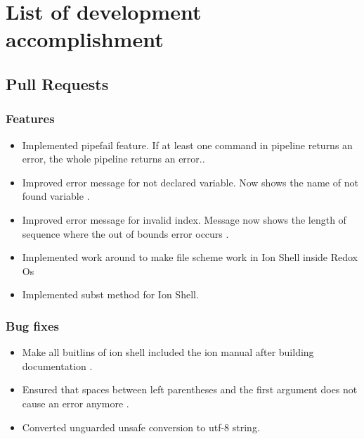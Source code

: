 \chapter{List of development accomplishment}

\section{Pull Requests}

\subsection{Features}
\label{accomplishment_features}

\begin{itemize}
	\item Implemented pipefail feature. If at least one command in pipeline returns an error, the whole pipeline returns an error.\cite{pr_pipefail}.
	\item Improved error message for not declared variable. Now shows the name of not found variable \cite{pr_better_not_found_variable_show}.
	\item Improved error message for invalid index. Message now shows the length of sequence where the out of bounds error occurs \cite{pr_error_message_shows_invalid_range}.
	\item Implemented work around to make file scheme work in Ion Shell inside Redox Os \cite{pr_file_scheme}
	\item Implemented subst method for Ion Shell. \cite{pr_subst_method}
\end{itemize}

\subsection{Bug fixes}\label{accomplishment_bug_fixes}

\begin{itemize}
	\item Make all buitlins of ion shell included the ion manual after building documentation \cite{pr_man_history_included_ion_manual}.
	\item Ensured that spaces between left parentheses and the first argument does not cause an error anymore .\cite{pr_fix_space_before_first_paranthese}
	\item Converted unguarded unsafe conversion to utf-8 string. \cite{pr_unsave_utf8_removal}
\end{itemize}

